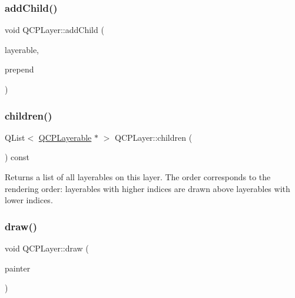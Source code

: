 \subsubsection{\texorpdfstring{addChild()}{addChild()}}
{\footnotesize\ttfamily void Q\+C\+P\+Layer\+::add\+Child (\begin{DoxyParamCaption}\item[{\mbox{\hyperlink{class_q_c_p_layerable}{Q\+C\+P\+Layerable}} $\ast$}]{layerable,  }\item[{bool}]{prepend }\end{DoxyParamCaption})\hspace{0.3cm}{\ttfamily [protected]}}

\mbox{\label{class_q_c_p_layer_a183b90941fc78f0b136edd77c5fb6966}} 
\subsubsection{\texorpdfstring{children()}{children()}}
{\footnotesize\ttfamily Q\+List$<$ \mbox{\hyperlink{class_q_c_p_layerable}{Q\+C\+P\+Layerable}} $\ast$ $>$ Q\+C\+P\+Layer\+::children (\begin{DoxyParamCaption}{ }\end{DoxyParamCaption}) const\hspace{0.3cm}{\ttfamily [inline]}}

Returns a list of all layerables on this layer. The order corresponds to the rendering order\+: layerables with higher indices are drawn above layerables with lower indices. \mbox{\label{class_q_c_p_layer_ab831a99c8d30b15ec4533ca341e8813b}} 
\subsubsection{\texorpdfstring{draw()}{draw()}}
{\footnotesize\ttfamily void Q\+C\+P\+Layer\+::draw (\begin{DoxyParamCaption}\item[{\mbox{\hyperlink{class_q_c_p_painter}{Q\+C\+P\+Painter}} $\ast$}]{painter }\end{DoxyParamCaption})\hspace{0.3cm}{\ttfamily [protected]}}

\mbox{\label{class_q_c_p_layer_a4a8e0a86f31462299e7fc8e8158dd2c6}} 
